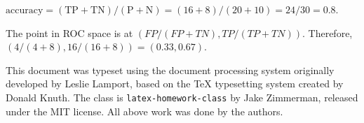 \documentclass[11pt,largemargins, anonymous]{homework}
\begin{document}
\clearpage
\maketitle
\clearpage

\question

\begin{alphaparts}
    \questionpart
    $ \mathrm{accuracy} = (\mathrm{TP + TN}) / (\mathrm{P + N}) = (16 + 8) / (20 + 10) = 24/30 = 0.8$.

    \questionpart
    The point in ROC space is at $\left ( FP / (FP + TN) , TP / (TP + TN) \right )$.
    Therefore, $ ( 4 / (4 + 8) , 16 / (16 + 8) ) = (0.33, 0.67)$.
\end{alphaparts}

\begin{colophon}
    This document was typeset using the \LaTeXe{} document processing system
    originally developed by Leslie Lamport, based on the \TeX{} typesetting system
    created by Donald Knuth.
    The class is \texttt{latex-homework-class} by Jake Zimmerman,
    released under the MIT license.
    All above work was done by the authors.
\end{colophon}
\end{document}
